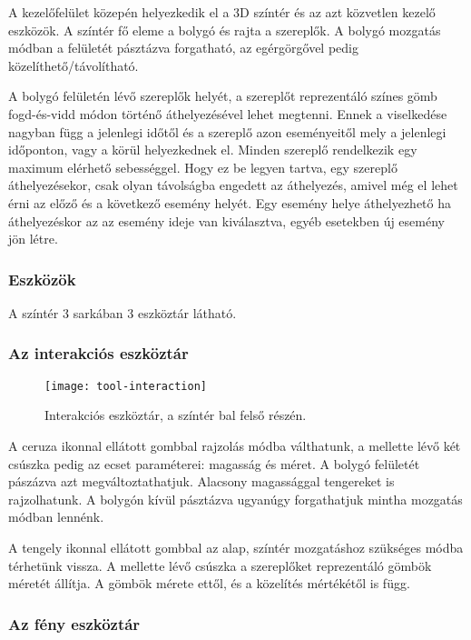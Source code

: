 A kezelőfelület közepén helyezkedik el a 3D színtér és az azt közvetlen kezelő eszközök. A színtér fő eleme a bolygó és rajta a szereplők. A bolygó mozgatás módban a felületét pásztázva forgatható, az egérgörgővel pedig közelíthető/távolítható.

A bolygó felületén lévő szereplők helyét, a szereplőt reprezentáló színes gömb fogd-és-vidd módon történő áthelyezésével lehet megtenni. Ennek a viselkedése nagyban függ a jelenlegi időtől és a szereplő azon eseményeitől mely a jelenlegi időponton, vagy a körül helyezkednek el. Minden szereplő rendelkezik egy maximum elérhető sebességgel. Hogy ez be legyen tartva, egy szereplő áthelyezésekor, csak olyan távolságba engedett az áthelyezés, amivel még el lehet érni az előző és a következő esemény helyét. Egy esemény helye áthelyezhető ha áthelyezéskor az az esemény ideje van kiválasztva, egyéb esetekben új esemény jön létre.


\subsubsection{Eszközök} \label{section:ui-utilities}

A színtér 3 sarkában 3 eszköztár látható.

\subsubsection{Az interakciós eszköztár}

\begin{figure}[h!]
	\centering
	\texttt{[image: tool-interaction]}
	\caption{Interakciós eszköztár, a színtér bal felső részén.}
	\label{fig:tool-interaction}
\end{figure}

A ceruza ikonnal ellátott gombbal rajzolás módba válthatunk, a mellette lévő két csúszka pedig az ecset paraméterei: magasság és méret. A bolygó felületét pászázva azt megváltoztathatjuk. Alacsony magassággal tengereket is rajzolhatunk. A bolygón kívül pásztázva ugyanúgy forgathatjuk mintha mozgatás módban lennénk.

A tengely ikonnal ellátott gombbal az alap, színtér mozgatáshoz szükséges módba térhetünk vissza. A mellette lévő csúszka a szereplőket reprezentáló gömbök méretét állítja. A gömbök mérete ettől, és a közelítés mértékétől is függ.

\subsubsection{Az fény eszköztár}

